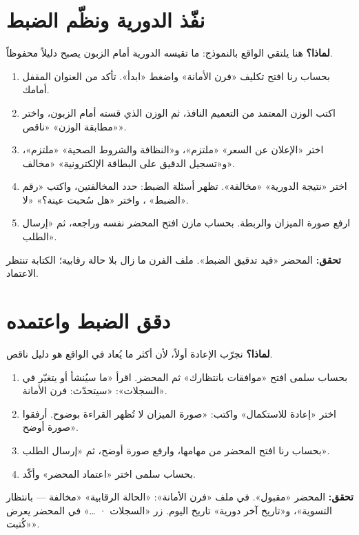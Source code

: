 \section{نفّذ الدورية ونظّم الضبط}
\label{sec:real-run}
\textbf{لماذا؟} هنا يلتقي الواقع بالنموذج: ما تقيسه الدورية أمام الزبون يصبح دليلاً محفوظاً.
\begin{enumerate}
\item بحساب رنا افتح تكليف «فرن الأمانة» واضغط «ابدأ». تأكد من العنوان المقفل أمامك.
\item اكتب الوزن المعتمد من التعميم النافذ، ثم الوزن الذي قسته أمام الزبون، واختر «مطابقة الوزن» «ناقص».
\item اختر «الإعلان عن السعر» «ملتزم»، و«النظافة والشروط الصحية» «ملتزم»، و«تسجيل الدقيق على البطاقة الإلكترونية» «مخالف».
\item اختر «نتيجة الدورية» «مخالفة». تظهر أسئلة الضبط: حدد المخالفتين، واكتب «رقم الضبط» ، واختر «هل سُحبت عينة؟» «لا».
\item ارفع صورة الميزان والربطة. بحساب مازن افتح المحضر نفسه وراجعه، ثم «إرسال الطلب».
\end{enumerate}
\textbf{تحقق:} المحضر «قيد تدقيق الضبط». ملف الفرن ما زال بلا حالة رقابية؛ الكتابة تنتظر الاعتماد.

\section{دقق الضبط واعتمده}
\label{sec:real-decide}
\textbf{لماذا؟} نجرّب الإعادة أولاً، لأن أكثر ما يُعاد في الواقع هو دليل ناقص.
\begin{enumerate}
\item بحساب سلمى افتح «موافقات بانتظارك» ثم المحضر. اقرأ «ما سيُنشأ أو يتغيّر في السجلات»: «سيتحدّث: فرن الأمانة».
\item اختر «إعادة للاستكمال» واكتب: «صورة الميزان لا تُظهر القراءة بوضوح. أرفقوا صورة أوضح».
\item بحساب رنا افتح المحضر من مهامها، وارفع صورة أوضح، ثم «إرسال الطلب».
\item بحساب سلمى اختر «اعتماد المحضر» وأكّد.
\end{enumerate}
\textbf{تحقق:} المحضر «مقبول». في ملف «فرن الأمانة»: «الحالة الرقابية» «مخالفة — بانتظار التسوية»، و«تاريخ آخر دورية» تاريخ اليوم. زر «السجلات · …» في المحضر يعرض «كُتبت».

